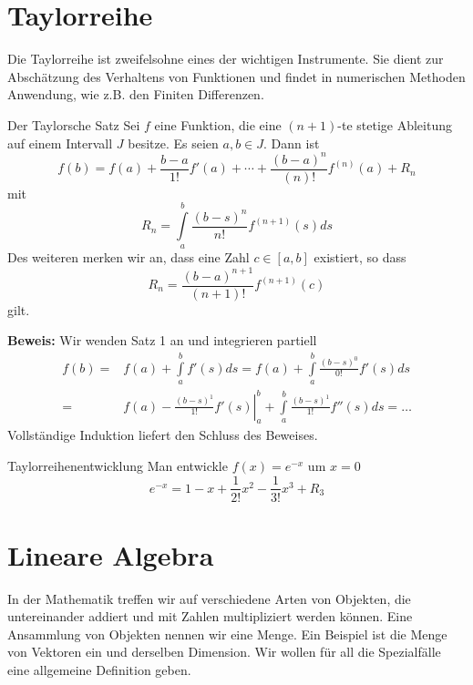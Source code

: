 \section{Taylorreihe}
Die Taylorreihe ist zweifelsohne eines der wichtigen Instrumente. Sie dient zur
Abschätzung des Verhaltens von Funktionen und findet in numerischen
Methoden Anwendung, wie z.B. den Finiten Differenzen.
\begin{satz}{Der Taylorsche Satz\label{theo:Taylor}} Sei $f$ eine Funktion, die
  eine $(n+1)$-te stetige Ableitung auf einem Intervall $J$ besitze. Es seien
  $a,b\in J$. Dann ist 
\[
    f(b)=f(a)+\frac{b-a}{1!}f'(a)+\cdots +\frac{(b-a)^{n}}{(n)!}f^{(n)}(a)+R_n
\]
  mit
\[
    R_n=\int\limits_a^b\frac{(b-s)^{n}}{n!}f^{(n+1)}(s)ds
\]
Des weiteren merken wir an, dass eine Zahl $c\in[a,b]$ existiert, so dass
\[
  R_n=\frac{(b-a)^{n+1}}{(n+1)!}f^{(n+1)}(c)
\]
gilt.
\end{satz}
{\bf Beweis:} Wir wenden Satz 1 an und integrieren partiell
\begin{align}
  f(b)=&f(a)+\int\limits_a^bf'(s)ds=f(a)+\int\limits_a^b\frac{(b-s)^0}{0!}f'(s)ds\nonumber\\
  =&f(a)-\left.\frac{(b-s)^1}{1!}f'(s)\right|_a^b+\int\limits_a^b\frac{(b-s)^1}{1!}f''(s)ds=\dots
  \label{eq:TaylorProof1}
\end{align}
Vollständige Induktion liefert den Schluss des Beweises.
\begin{example}{Taylorreihenentwicklung}
Man entwickle $f(x)=e^{-x}$ um $x=0$
  \[ e^{-x}=1-x+\frac{1}{2!}x^2-\frac{1}{3!}x^3+R_3 \]
\end{example}
\section{Lineare Algebra}
In der Mathematik treffen wir auf verschiedene Arten von Objekten, die
untereinander addiert und mit Zahlen multipliziert werden können. Eine
Ansammlung von Objekten nennen wir eine Menge. Ein Beispiel ist die Menge von
Vektoren ein und derselben Dimension. Wir wollen für all die
Spezialfälle eine allgemeine Definition geben. 
